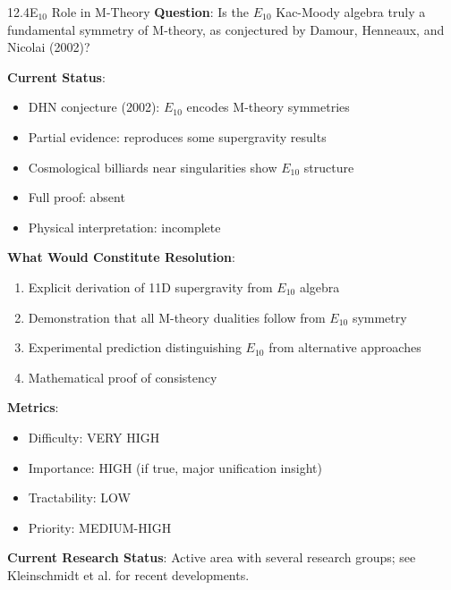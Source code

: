 \begin{openproblem}{12.4}{E$_{10}$ Role in M-Theory}
\textbf{Question}: Is the $E_{10}$ Kac-Moody algebra truly a fundamental symmetry of M-theory, as conjectured by Damour, Henneaux, and Nicolai (2002)?

\textbf{Current Status}:
\begin{itemize}
    \item DHN conjecture (2002): $E_{10}$ encodes M-theory symmetries \cite{damour2002e10}
    \item Partial evidence: reproduces some supergravity results
    \item Cosmological billiards near singularities show $E_{10}$ structure
    \item Full proof: absent
    \item Physical interpretation: incomplete
\end{itemize}

\textbf{What Would Constitute Resolution}:
\begin{enumerate}
    \item Explicit derivation of 11D supergravity from $E_{10}$ algebra
    \item Demonstration that all M-theory dualities follow from $E_{10}$ symmetry
    \item Experimental prediction distinguishing $E_{10}$ from alternative approaches
    \item Mathematical proof of consistency
\end{enumerate}

\textbf{Metrics}:
\begin{itemize}
    \item Difficulty: VERY HIGH
    \item Importance: HIGH (if true, major unification insight)
    \item Tractability: LOW
    \item Priority: MEDIUM-HIGH
\end{itemize}

\textbf{Current Research Status}: Active area with several research groups; see Kleinschmidt et al. for recent developments.
\end{openproblem}

